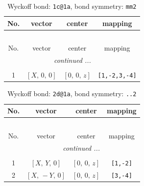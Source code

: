 \documentclass[fleqn,8pt]{jsarticle}
\begin{document}
\renewcommand{\arraystretch}{1.2}
\begin{longtable}{cccc}
\caption{Wyckoff bond: {\tt 1c@1a}, bond symmetry: {\tt mm2}}
 \\
 \hline \hline
No. & vector & center & mapping \\ \hline \endfirsthead

\multicolumn{3}{l}{\tablename\ \thetable{}} \\
 \hline \hline
No. & vector & center & mapping \\ \hline \endhead

 \hline \hline
\multicolumn{3}{r}{\footnotesize\it continued ...} \\ \endfoot

 \hline \hline
\multicolumn{3}{r}{} \\ \endlastfoot

1 & $\left[ X,\, 0,\, 0 \right]$ & $\left[ 0,\, 0,\, z \right]$ & {\tt [1,-2,3,-4]} \\
\end{longtable}
\renewcommand{\arraystretch}{1.2}
\begin{longtable}{cccc}
\caption{Wyckoff bond: {\tt 2d@1a}, bond symmetry: {\tt ..2}}
 \\
 \hline \hline
No. & vector & center & mapping \\ \hline \endfirsthead

\multicolumn{3}{l}{\tablename\ \thetable{}} \\
 \hline \hline
No. & vector & center & mapping \\ \hline \endhead

 \hline \hline
\multicolumn{3}{r}{\footnotesize\it continued ...} \\ \endfoot

 \hline \hline
\multicolumn{3}{r}{} \\ \endlastfoot

1 & $\left[ X,\, Y,\, 0 \right]$ & $\left[ 0,\, 0,\, z \right]$ & {\tt [1,-2]} \\ \hline
2 & $\left[ X,\, - Y,\, 0 \right]$ & $\left[ 0,\, 0,\, z \right]$ & {\tt [3,-4]} \\
\end{longtable}
\renewcommand{\arraystretch}{1.2}
\end{document}
